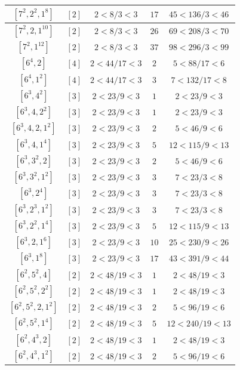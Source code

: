 \documentclass{article}%
\begin{document}
\begin{center}
\begin{longtable}{||c|c|c|c|c||}
$[7^{2}, 2^{2}, 1^{8}]$ & $[2]$ & $2 < 8/3 < 3$ & $17$ & $45 < 136/3 < 46$ \\ \hline 
$[7^{2}, 2, 1^{10}]$ & $[2]$ & $2 < 8/3 < 3$ & $26$ & $69 < 208/3 < 70$ \\ \hline 
$[7^{2}, 1^{12}]$ & $[2]$ & $2 < 8/3 < 3$ & $37$ & $98 < 296/3 < 99$ \\ \hline 
$[6^{4}, 2]$ & $[4]$ & $2 < 44/17 < 3$ & $2$ & $5 < 88/17 < 6$ \\ \hline 
$[6^{4}, 1^{2}]$ & $[4]$ & $2 < 44/17 < 3$ & $3$ & $7 < 132/17 < 8$ \\ \hline 
$[6^{3}, 4^{2}]$ & $[3]$ & $2 < 23/9 < 3$ & $1$ & $2 < 23/9 < 3$ \\ \hline 
$[6^{3}, 4, 2^{2}]$ & $[3]$ & $2 < 23/9 < 3$ & $1$ & $2 < 23/9 < 3$ \\ \hline 
$[6^{3}, 4, 2, 1^{2}]$ & $[3]$ & $2 < 23/9 < 3$ & $2$ & $5 < 46/9 < 6$ \\ \hline 
$[6^{3}, 4, 1^{4}]$ & $[3]$ & $2 < 23/9 < 3$ & $5$ & $12 < 115/9 < 13$ \\ \hline 
$[6^{3}, 3^{2}, 2]$ & $[3]$ & $2 < 23/9 < 3$ & $2$ & $5 < 46/9 < 6$ \\ \hline 
$[6^{3}, 3^{2}, 1^{2}]$ & $[3]$ & $2 < 23/9 < 3$ & $3$ & $7 < 23/3 < 8$ \\ \hline 
$[6^{3}, 2^{4}]$ & $[3]$ & $2 < 23/9 < 3$ & $3$ & $7 < 23/3 < 8$ \\ \hline 
$[6^{3}, 2^{3}, 1^{2}]$ & $[3]$ & $2 < 23/9 < 3$ & $3$ & $7 < 23/3 < 8$ \\ \hline 
$[6^{3}, 2^{2}, 1^{4}]$ & $[3]$ & $2 < 23/9 < 3$ & $5$ & $12 < 115/9 < 13$ \\ \hline 
$[6^{3}, 2, 1^{6}]$ & $[3]$ & $2 < 23/9 < 3$ & $10$ & $25 < 230/9 < 26$ \\ \hline 
$[6^{3}, 1^{8}]$ & $[3]$ & $2 < 23/9 < 3$ & $17$ & $43 < 391/9 < 44$ \\ \hline 
$[6^{2}, 5^{2}, 4]$ & $[2]$ & $2 < 48/19 < 3$ & $1$ & $2 < 48/19 < 3$ \\ \hline 
$[6^{2}, 5^{2}, 2^{2}]$ & $[2]$ & $2 < 48/19 < 3$ & $1$ & $2 < 48/19 < 3$ \\ \hline 
$[6^{2}, 5^{2}, 2, 1^{2}]$ & $[2]$ & $2 < 48/19 < 3$ & $2$ & $5 < 96/19 < 6$ \\ \hline 
$[6^{2}, 5^{2}, 1^{4}]$ & $[2]$ & $2 < 48/19 < 3$ & $5$ & $12 < 240/19 < 13$ \\ \hline 
$[6^{2}, 4^{3}, 2]$ & $[2]$ & $2 < 48/19 < 3$ & $1$ & $2 < 48/19 < 3$ \\ \hline 
$[6^{2}, 4^{3}, 1^{2}]$ & $[2]$ & $2 < 48/19 < 3$ & $2$ & $5 < 96/19 < 6$ \\ \hline 

\end{longtable}
\end{center}
\end{document}
